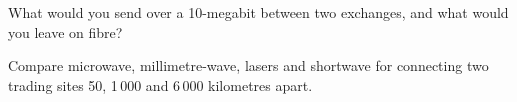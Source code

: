 \begin{interviewq}\label{iq:nw:long-haul-wireless:5}
What would you send over a 10-megabit  between two exchanges, and what would you leave on fibre?
\end{interviewq}

\begin{interviewq}\label{iq:nw:long-haul-wireless:6}
Compare microwave, millimetre-wave, lasers and shortwave for connecting two trading sites 50, 1\,000 and 6\,000 kilometres apart.
\end{interviewq}
